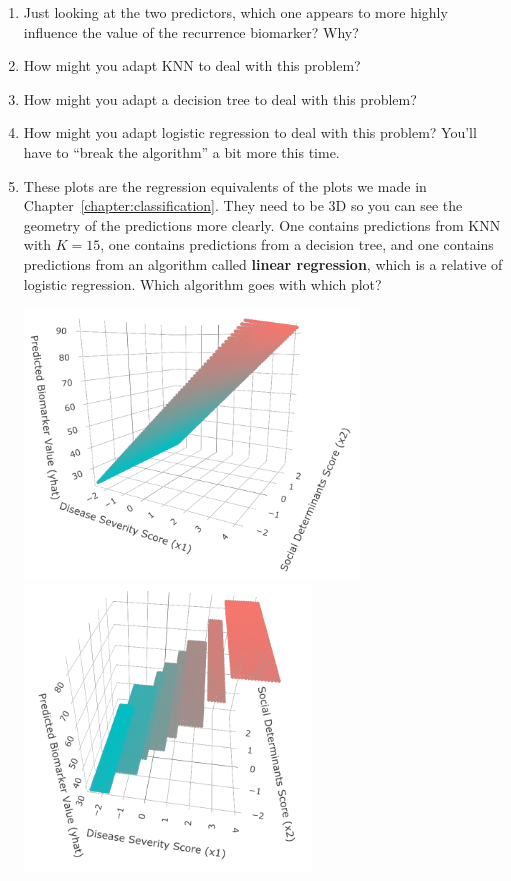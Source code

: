 \begin{enumerate}
\item Just looking at the two predictors, which one appears to more highly influence the value of the recurrence biomarker? Why?
\item How might you adapt KNN to deal with this problem?
\item How might you adapt a decision tree to deal with this problem?
\item How might you adapt logistic regression to deal with this problem? You'll have to ``break the algorithm'' a bit more this time.  
\item These plots are the regression equivalents of the plots we made in Chapter~\ref{chapter:classification}. They need to be 3D so you can see the geometry of the predictions more clearly. One contains predictions from KNN with $K=15$, one contains predictions from a decision tree, and one contains predictions from an algorithm called \textbf{linear regression}, which is a relative of logistic regression. Which algorithm goes with which plot?
\begin{center}
\includegraphics[width=0.7\textwidth]{img/esl-reg-3d-linear-small.png}
\includegraphics[width=0.6\textwidth]{img/esl-reg-3d-decision-tree-small.png}

\end{center}
\end{enumerate}
